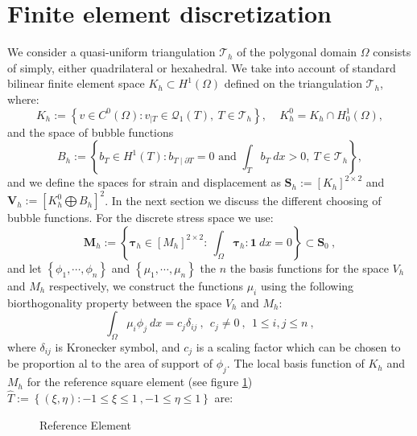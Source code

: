 \documentclass[preprint,12pt,authoryear]{elsarticle}
\begin{document}
\section{Finite element discretization}\label{sec:four}
We consider a quasi-uniform triangulation $\mathcal{T}_{h}$ of the polygonal domain $\Omega$ consists of simply, either quadrilateral or hexahedral.
We take into account of standard bilinear finite element space $K_{h}\subset H^{1}(\Omega)$ defined on the triangulation $\mathcal{T}_{h}$, where:
\begin{equation}
K_{h} := \left\lbrace v \in C^{0}(\Omega): v_{\mid T}\in \mathcal{Q}_{1}(T), \: T\in \mathcal{T}_{h} \right\rbrace ,
\:\:\:\:\: K_{h}^{0} = K_{h} \cap H_{0}^{1}(\Omega) ,
\end{equation} 
and the space of bubble functions
\begin{equation}
B_{h} := \left\lbrace b_{T}\in H^{1}(T): b_{T\mid \partial T}=0 
\mbox{ and } \int_{T} b_{T} \: dx > 0, \: T\in \mathcal{T}_{h} 
\right\rbrace ,
\end{equation}
and we define the spaces for strain and displacement as $\bm{S}_{h}:=[K_{h}]^{2\times 2}$ and $\bm{V}_{h}:=\left[K_{h}^{0} \bigoplus B_{h}\right]^{2}$. 
In the next section we discuss the different choosing of bubble functions.
For the discrete stress space we use:
\begin{equation}
\bm{M}_{h}:=\left\lbrace \bm{\tau}_{h}\in \left[M_{h}\right]^{2\times 2}: \: \int_{\Omega} \bm{\tau}_{h} : \bm{1} \: dx = 0 \right\rbrace \subset \bm{S}_{0}\:,
\end{equation}
and let $\left\lbrace \phi_{1}, \cdots, \phi_{n}\right\rbrace$ and 
$\left\lbrace \mu_{1}, \cdots, \mu_{n}\right\rbrace$ the $n$ the basis functions for the space $V_{h}$ and $M_{h}$ respectively, we construct the functions $\mu_{i}$ using the following biorthogonality property between the space $V_{h}$ and $M_{h}$:
\begin{equation}
\int_{\Omega}\mu_{i}\phi_{j} \: dx = c_{j}\delta_{ij}\:, \:\: c_{j}\neq 0\:,
\:\: 1 \leq i,j \leq n \:,
\end{equation}
where $\delta_{ij}$ is Kronecker symbol, and $c_{j}$ is a scaling factor which can be chosen to be proportion al to the area of support of $\phi_{j}$.
The local basis function of $K_{h}$ and $M_{h}$ for the reference square element (see figure \ref{fig:ref_element}) $\hat{T}:=\left\lbrace (\xi,\eta): -1\leq \xi \leq 1 \:, -1\leq \eta \leq 1 \right\rbrace$ are:
\begin{figure}[h!]
\begin{center}

\caption{Reference Element \label{fig:ref_element}}
\end{center}
\end{figure}
\end{document}
